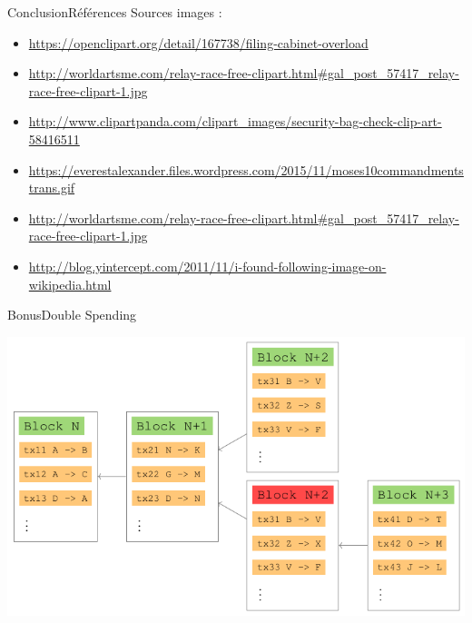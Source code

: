 \documentclass[xcolor=dvipsnames]{beamer}
\begin{document}
\begin{frame}{Conclusion}{Références}
Sources images :
\begin{itemize}
\item \url{https://openclipart.org/detail/167738/filing-cabinet-overload}
\item \url{http://worldartsme.com/relay-race-free-clipart.html\#gal_post_57417_relay-race-free-clipart-1.jpg}
\item \url{http://www.clipartpanda.com/clipart_images/security-bag-check-clip-art-58416511}
\item \url{https://everestalexander.files.wordpress.com/2015/11/moses10commandmentstrans.gif}
\item \url{http://worldartsme.com/relay-race-free-clipart.html\#gal_post_57417_relay-race-free-clipart-1.jpg}
\item \url{http://blog.yintercept.com/2011/11/i-found-following-image-on-wikipedia.html}
\end{itemize}
\end{frame}

\begin{frame}{Bonus}{Double Spending}
\begin{center}
\includegraphics[scale=.4]{double-spending.png} 
\end{center}

\end{frame}
\end{document}
